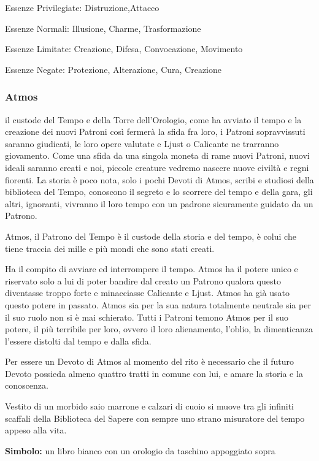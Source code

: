 \documentclass[a4paper,11pt,twoside,openany]{book}
\begin{document}
\bigskip

Essenze Privilegiate: Distruzione,Attacco

Essenze Normali: Illusione, Charme, Trasformazione

Essenze Limitate: Creazione, Difesa, Convocazione, Movimento

Essenze Negate: Protezione, Alterazione, Cura, Creazione

\subsubsection{Atmos}

\label{atmos}

il custode del Tempo e della Torre dell'Orologio, come ha avviato il tempo e la creazione dei nuovi Patroni così fermerà la sfida fra loro, i Patroni sopravvissuti saranno giudicati, le loro opere valutate e Ljust o Calicante ne trarranno giovamento. Come una sfida da una singola moneta di rame nuovi Patroni, nuovi ideali saranno creati e noi, piccole creature vedremo nascere nuove civiltà e regni fiorenti. La storia è poco nota, solo i pochi Devoti di Atmos, scribi e studiosi della biblioteca del Tempo, conoscono il segreto e lo scorrere del tempo e della gara, gli altri, ignoranti, vivranno il loro tempo con un padrone sicuramente guidato da un Patrono.

Atmos, il Patrono del Tempo è il custode della storia e del tempo, è colui che tiene traccia dei mille e più mondi che sono stati creati.

Ha il compito di avviare ed interrompere il tempo. Atmos ha il potere unico e riservato solo a lui di poter bandire dal creato un Patrono qualora questo diventasse troppo forte e minacciasse Calicante e Ljust. Atmos ha già usato questo potere in passato. Atmos sia per la sua natura totalmente neutrale sia per il suo ruolo non si è mai schierato. Tutti i Patroni temono Atmos per il suo potere, il più terribile per loro, ovvero il loro alienamento, l'oblio, la dimenticanza l'essere distolti dal tempo e dalla sfida.

Per essere un Devoto di Atmos al momento del rito è necessario che il futuro Devoto possieda almeno quattro tratti in comune con lui, e amare la storia e la conoscenza.

Vestito di un morbido saio marrone e calzari di cuoio si muove tra gli infiniti scaffali della Biblioteca del Sapere con sempre uno strano misuratore del tempo appeso alla vita.

\textbf{Simbolo:} un libro bianco con un orologio da taschino appoggiato
sopra
\end{document}
